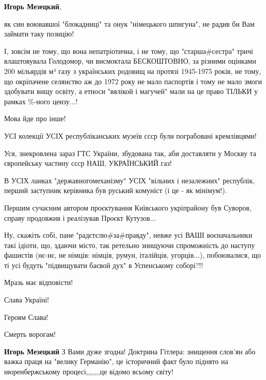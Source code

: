 \begin{itemize}
\begin{itemize}
\begin{itemize}
 
\textbf{Игорь Мезецкий}, 

як син воювавшої "блокадниці" та онук "німецького шпигуна", не радив би Вам
займати таку позицію!

І, зовсім не тому, що вона непатріотична, і не тому, що "старша\#сестра" тричі
влаштовувала Голодомор, чи висмоктала БЕСКОШТОВНО, за різними оцінками ~ 200
мільярдів м³ газу з українських родовищ на протязі 1945-1975 років, не тому, що
окріпачене селянство аж до 1972 року не мало паспортів і тому не мало змоги
здобувати вищу освіту, а етноси "вялікой і магучей" мали на це право ТІЛЬКИ у
рамках \%-ного цензу...!

Мова йде про інше!

УСІ колекції УСІХ республіканських музеїв ссср були пограбовані кремлівцями!

Уся, знекровлена зараз ГТС України, збудована так, аби доставляти у Москву та
європейську частину ссср НАШ, УКРАЇНСЬКИЙ газ!

В УСІХ ланках "державногомеханізму" УСІХ "вільних і незалежних" республік,
перший заступник керівника був руський комуніст (і це - як мінімум!).

Першим сучасним автором проєктування Київського укріпрайону був Суворов, справу
продовжив і реалізував Проєкт Кутузов...

Ну, скажіть собі, пане "радєтєлю\#за\#правду", невже усі ВАШІ воєначальники такі
ідіоти, що, здаючи місто, так ретельно знищуючи спроможність до наступу
фашистів (нє-нє, не німців: німців, румун, італійців, угорців...), побоювалися,
що ті усі будуть "підвищувати баєвой дух" в Успенському соборі?!!

Мразь має відповісти!

Слава Україні!

Героям Слава!

Смерть ворогам!

 
\textbf{Игорь Мезецкий} З Вами дуже згодна! Доктрина Гітлера: знищення слов'ян
або важка праця на "велику Германію", це історичний факт було піднято на
нюренбержському процесі,,,,,,,це відомо всьому світу!



\end{itemize}
\end{itemize}
\end{itemize}
